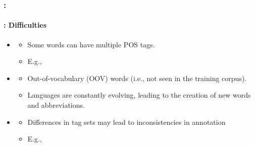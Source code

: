 \documentclass[xcolor=table]{beamer}
\begin{document}
\begin{frame}
	\frametitle{\insertshortsubtitle: \insertsection}
	\framesubtitle{\insertsubsection: Difficulties}

	\begin{itemize}
		\item {}
		\begin{itemize}
			\item Some words can have multiple POS tags.
			\item E.g., 
		\end{itemize}
		
		\item {}
		\begin{itemize}
			\item Out-of-vocabulary (OOV) words (i.e., not seen in the training corpus).
			\item Languages are constantly evolving, leading to the creation of new words and abbreviations.
		\end{itemize}
		
		\item {}
		\begin{itemize}
			\item Differences in tag sets may lead to inconsistencies in annotation
			\item E.g., 
		\end{itemize}
	\end{itemize}

\end{frame}
\end{document}
